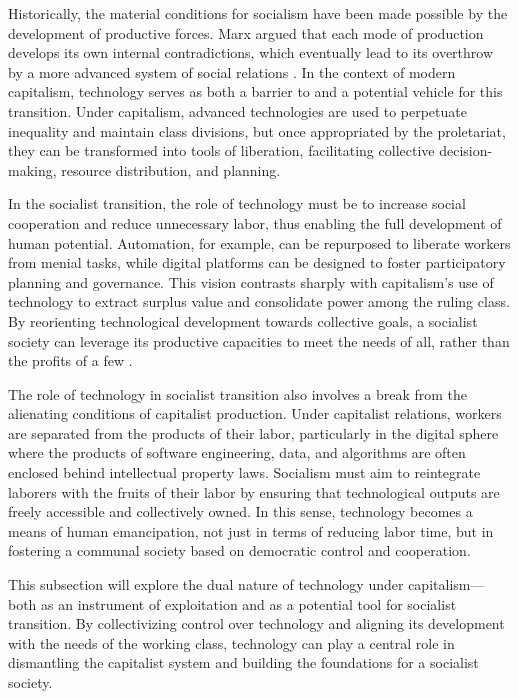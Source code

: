 \begin{refsection}
Historically, the material conditions for socialism have been made possible by the development of productive forces. Marx argued that each mode of production develops its own internal contradictions, which eventually lead to its overthrow by a more advanced system of social relations \cite[pp.~88]{marx1959}. In the context of modern capitalism, technology serves as both a barrier to and a potential vehicle for this transition. Under capitalism, advanced technologies are used to perpetuate inequality and maintain class divisions, but once appropriated by the proletariat, they can be transformed into tools of liberation, facilitating collective decision-making, resource distribution, and planning.

In the socialist transition, the role of technology must be to increase social cooperation and reduce unnecessary labor, thus enabling the full development of human potential. Automation, for example, can be repurposed to liberate workers from menial tasks, while digital platforms can be designed to foster participatory planning and governance. This vision contrasts sharply with capitalism’s use of technology to extract surplus value and consolidate power among the ruling class. By reorienting technological development towards collective goals, a socialist society can leverage its productive capacities to meet the needs of all, rather than the profits of a few \cite[pp.~36]{gorz1982}.

The role of technology in socialist transition also involves a break from the alienating conditions of capitalist production. Under capitalist relations, workers are separated from the products of their labor, particularly in the digital sphere where the products of software engineering, data, and algorithms are often enclosed behind intellectual property laws. Socialism must aim to reintegrate laborers with the fruits of their labor by ensuring that technological outputs are freely accessible and collectively owned. In this sense, technology becomes a means of human emancipation, not just in terms of reducing labor time, but in fostering a communal society based on democratic control and cooperation.

This subsection will explore the dual nature of technology under capitalism—both as an instrument of exploitation and as a potential tool for socialist transition. By collectivizing control over technology and aligning its development with the needs of the working class, technology can play a central role in dismantling the capitalist system and building the foundations for a socialist society.


\end{refsection}
